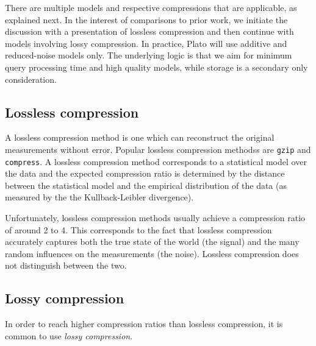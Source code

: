 There are multiple models and respective compressions that are applicable, as explained next. In the interest of comparisons to prior work, we initiate the discussion with a presentation of lossless compression and then continue with models involving lossy compression. In practice, Plato will use additive and reduced-noise models only. The underlying logic is that we aim for minimum query processing time and high quality models, while storage is a secondary only consideration.


\subsection{Lossless compression}
\label{sec:lossless}

A lossless compression method is one which can reconstruct the
original measurements without error. Popular lossless compression
methodss are {\tt gzip} and {\tt compress}. A lossless compression
method corresponds to a statistical model over the data and the
expected compression ratio is determined by the distance between
the statistical model and the empirical distribution of the data (as
measured by the the Kullback-Leibler divergence). 

Unfortunately, lossless compression methods usually achieve a
compression ratio of around 2 to 4. This corresponds to the
fact that lossless compression accurately captures both the true state of the world (the signal)
and the many random influences on the measurements (the noise). 
Lossless compression does not distinguish between the two.

\newcommand{\vx}{\mathbf{x}}
\newcommand{\hx}{\hat{x}}
\newcommand{\vhx}{\hat{\mathbf{x}}}
\newcommand{\vc}{\mathbf{c}}
\newcommand{\vr}{\mathbf{r}}

\subsection{Lossy compression}
In order to reach higher compression ratios than lossless
compression, it is common to use {\em lossy compression}.

